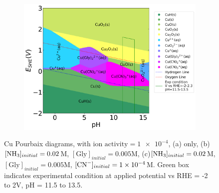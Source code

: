 \documentclass[journal=jacsat,manuscript=article]{achemso}
\begin{document}
\begin{figure}[htbp]
\begin{subfigure}[b]{0.3\textwidth}
        \par\medskip
    \end{subfigure}
    \begin{subfigure}[b]{0.3\textwidth}
        \subcaption{}\label{fig:Cu_Pourbaix_NH3_Gly_CN}
        \includegraphics[width=\textwidth]{Figures/pourbaix_diagrams/Cu-NH3-H2O_activity=1e-04_[NH3]=0.02M_[Gly]=0.005M_[CN]=0.0001.png}
        \par\medskip   
    \end{subfigure}
    \caption{Cu Pourbaix diagrams, with $\text{ion activity}=\num{1e-4}$, (a) only, (b)$[\ce{NH3}]_{initial}= 0.02$M, $[\text{Gly}]_{initial}=0.005$M, (c)$[\ce{NH3}]_{initial}= 0.02$M, $[\text{Gly}]_{initial}=0.005$M,  $[\ce{CN-}]_{initial}=\num{1e-4}$M. Green box indicates experimental condition at applied potential vs RHE = -2 to 2V, pH = 11.5 to 13.5.}
    \label{fig:Cu_Pourbaix}
\end{figure}
\end{document}
